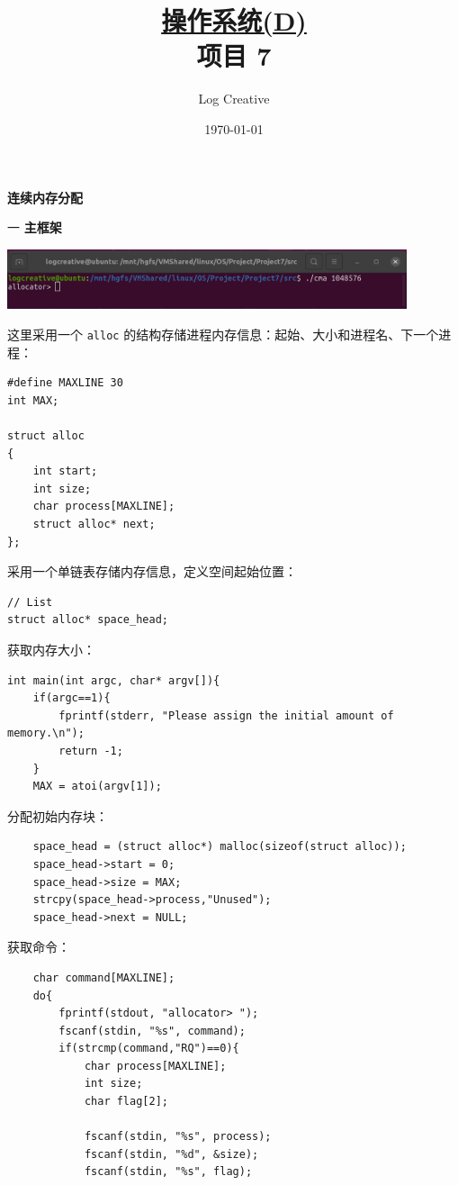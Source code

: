 \documentclass[12pt,a4paper]{article}
\newenvironment{problems}{\begin{list}{}{\renewcommand{\makelabel}[1]{\textbf{##1}\hfil}}}{\end{list}}
\begin{document}
\title{\normalsize \underline{操作系统(D)}\\\LARGE 项目 7}
\author{Log Creative }
\date{\today}
\maketitle

\textbf{连续内存分配}
\begin{problems}
    \item[一] \textbf{主框架}
    
    \includegraphics[width=0.88\textwidth]{input.png}

    这里采用一个 \texttt{alloc} 的结构存储进程内存信息：起始、大小和进程名、下一个进程：
    \begin{lstlisting}
#define MAXLINE 30
int MAX;

struct alloc
{
    int start;
    int size;
    char process[MAXLINE];
    struct alloc* next;
};
    \end{lstlisting}
    采用一个单链表存储内存信息，定义空间起始位置：
    \begin{lstlisting}
// List
struct alloc* space_head;
    \end{lstlisting}
    
    获取内存大小：
    \begin{lstlisting}
int main(int argc, char* argv[]){
    if(argc==1){
        fprintf(stderr, "Please assign the initial amount of memory.\n");
        return -1;
    }
    MAX = atoi(argv[1]);
    \end{lstlisting}

    分配初始内存块：
    \begin{lstlisting}
    space_head = (struct alloc*) malloc(sizeof(struct alloc));
    space_head->start = 0;
    space_head->size = MAX;
    strcpy(space_head->process,"Unused");
    space_head->next = NULL;
    \end{lstlisting}

    获取命令：
    \begin{lstlisting}
    char command[MAXLINE];
    do{
        fprintf(stdout, "allocator> ");
        fscanf(stdin, "%s", command);
        if(strcmp(command,"RQ")==0){
            char process[MAXLINE];
            int size;
            char flag[2];

            fscanf(stdin, "%s", process);
            fscanf(stdin, "%d", &size);
            fscanf(stdin, "%s", flag);


\end{lstlisting}
\end{problems}
\end{document}
